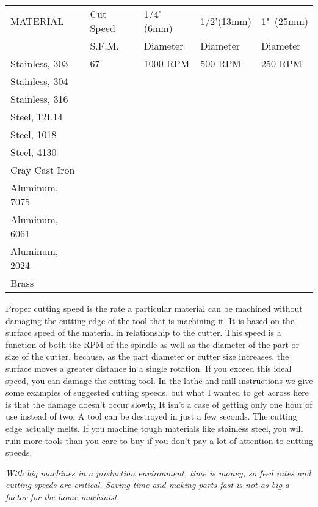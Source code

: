 \bigskip

\begin{tabular}{|l|l|l l l|}
\hline
MATERIAL & Cut Speed & 1/4"(6mm) & 1/2'(13mm)& 1"\ (25mm) \\
& S.F.M. & Diameter & Diameter & Diameter \\
\hline
				
Stainless, 303& 67 & 1000 RPM & 500 RPM & 250 RPM \\
Stainless, 304 &&&&\\
Stainless, 316 &&&&\\
Steel, 12L14 &&&&\\
Steel, 1018 &&&&\\
Steel, 4130 &&&&\\
Cray Cast Iron &&&&\\
Aluminum, 7075 &&&&\\			
Aluminum, 6061 &&&&\\
Aluminum, 2024 &&&&\\
Brass &&&&\\
\hline
\end{tabular}
\bigskip


Proper cutting speed is the rate a particular material can be machined without
damaging the cutting edge of the tool that is machining it. It is based on the
surface speed of the material in relationship to the cutter. This speed is a
function of both the RPM of the spindle as well as the diameter of the part or
size of the cutter, because, as the part diameter or cutter size increases, the
surface moves a greater distance in a single rotation. If you exceed this ideal
speed, you can damage the cutting tool. In the lathe and mill instructions we
give some examples of suggested cutting speeds, but what I wanted to get across
here is that the damage doesn't occur slowly, It isn't a case of getting only
one hour of use instead of two. A tool can be destroyed in just a few seconds.
The cutting edge actually melts. If you machine tough materials like stainless
steel, you will ruin more tools than you care to buy if you don't pay a lot of
attention to cutting speeds.

\bigskip
\textit{With big machines in a production environment, time is money, so feed
rates and cutting speeds are critical. Saving time and making parts fast is not
as big a factor for the home machinist.}
\bigskip


